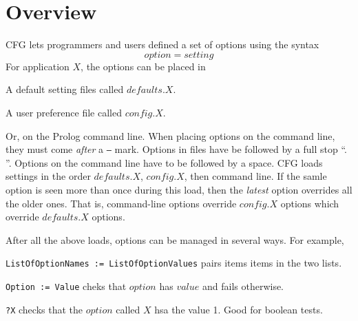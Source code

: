 \documentclass[twocolumn,global]{svjour}
\begin{document}
	 

\section{ Overview}

CFG lets programmers and users
defined a set of options using the syntax
\[
option = setting
\]
For application $X$, the options can be placed
in
\bi
\item
A default setting files called $defaults.X$.
\item
A user preference file called $config.X$.
\item
Or, on the  Prolog
command line. When placing options on the
command line, they must come {\em after}
a {\tt --} mark.
\ei Options in files have be followed by a
full stop ``. ''. Options on the command line
have to be followed by a space.
CFG loads settings in the order $defaults.X$,
	$config.X$, then command line.
If the samle option is seen more than once during
this load, then the {\em latest} option overrides
all the older ones. That is, command-line options
override $config.X$ options which override $defaults.X$
options.

After all the above loads, options can be managed
in several ways. For example,
\bd
\item[{\tt ListOfOptionNames := ListOfOptionValues}]
pairs items items in the two lists.
\item[{\tt Option := Value}]
cheks that $option$ has $value$ and fails otherwise.
\item[{\tt ?X}]
checks that the $option$ called $X$ hsa the value 1.
Good for boolean tests.
\ed
\end{document}
